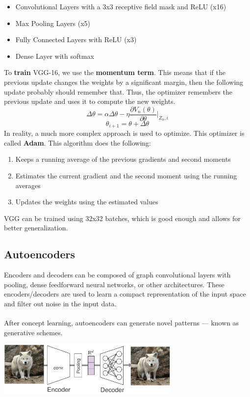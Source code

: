 \documentclass{article}
\begin{document}
\begin{itemize}
	\item Convolutional Layers with a 3x3 receptive field mask and ReLU (x16)
	\item Max Pooling Layers (x5)
	\item Fully Connected Layers with ReLU (x3)
	\item Dense Layer with softmax
\end{itemize}
To \textbf{train} VGG-16, we use the \textbf{momentum term}. This means that if the previous update changes the weights by a significant margin, then the following update probably should remember that. Thus, the optimizer remembers the previous update and uses it to compute the new weights.
\[ \Delta\theta = \alpha\Delta\theta - \eta\displaystyle\frac{\partial V_n(\theta)}{\partial\theta}\Bigg|_{Z_n,i} \]
\[ \theta_{i+1} = \theta + \Delta\theta \]
In reality, a much more complex approach is used to optimize. This optimizer is called \textbf{Adam}. This algorithm does the following:

\begin{enumerate}
	\item Keeps a running average of the previous gradients and second moments
	\item Estimates the current gradient and the second moment using the running averages
	\item Updates the weights using the estimated values
\end{enumerate}
VGG can be trained using 32x32 batches, which is good enough and allows for better generalization.

\subsection{Autoencoders}
Encoders and decoders can be composed of graph convolutional layers with pooling, dense feedforward neural networks, or other architectures. These encoders/decoders are used to learn a compact representation of the input space and filter out noise in the input data. \\ \\
After concept learning, autoencoders can generate novel patterns — known as generative schemes.

\begin{center}
	\includegraphics[width=9cm]{assets/encoders.png}
\end{center}
\end{document}

